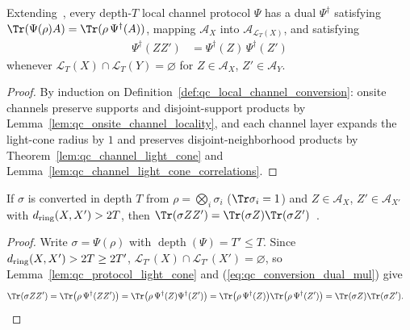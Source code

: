 \begin{lemma}
    \label{lem:qc_protocol_light_cone}
    \leanok
    Extending~\cite[Theorem~1]{Malz2024Preparation}, every depth-$T$ local channel protocol $\Psi$ has a dual $\Psi^\dagger$ satisfying $\Tr(\Psi(\rho)A)=\Tr(\rho\,\Psi^\dagger(A))$, mapping $\mathcal A_X$ into $\mathcal A_{\mathcal L_T(X)}$, and satisfying
    \begin{align}
        \Psi^\dagger(ZZ') & =\Psi^\dagger(Z)\,\Psi^\dagger(Z')
        \label{eq:qc_conversion_dual_mul}
    \end{align}
    whenever $\mathcal L_T(X)\cap\mathcal L_T(Y)=\varnothing$ for $Z\in\mathcal A_X$, $Z'\in\mathcal A_Y$.
\end{lemma}
\begin{proof}
    \leanok
    By induction on Definition~\ref{def:qc_local_channel_conversion}: onsite channels preserve supports and disjoint-support products by Lemma~\ref{lem:qc_onsite_channel_locality}, and each channel layer expands the light-cone radius by $1$ and preserves disjoint-neighborhood products by Theorem~\ref{lem:qc_channel_light_cone} and Lemma~\ref{lem:qc_channel_light_cone_correlations}.
\end{proof}

\begin{lemma}
    \label{lem:qc_local_channel_conversion_correlations}
    \leanok
    If $\sigma$ is converted in depth $T$ from $\rho=\bigotimes_i\sigma_i$ ($\Tr\sigma_i=1$) and $Z\in\mathcal A_X$, $Z'\in\mathcal A_{X'}$ with $d_{\rm ring}(X,X')>2T$, then $\Tr(\sigma ZZ')=\Tr(\sigma Z)\Tr(\sigma Z')$~\cite{Piroli2021LOCC}.
\end{lemma}
\begin{proof}
    \leanok
    Write $\sigma=\Psi(\rho)$ with $\operatorname{depth}(\Psi)=T'\le T$. Since $d_{\rm ring}(X,X')>2T\ge2T'$, $\mathcal L_{T'}(X)\cap\mathcal L_{T'}(X')=\varnothing$, so Lemma~\ref{lem:qc_protocol_light_cone} and (\ref{eq:qc_conversion_dual_mul}) give
    \begin{align}
        \Tr(\sigma ZZ') & =\Tr\bigl(\rho\,\Psi^\dagger(ZZ')\bigr)
        =\Tr\bigl(\rho\,\Psi^\dagger(Z)\Psi^\dagger(Z')\bigr)
        =\Tr\bigl(\rho\,\Psi^\dagger(Z)\bigr)\Tr\bigl(\rho\,\Psi^\dagger(Z')\bigr)
        =\Tr(\sigma Z)\Tr(\sigma Z').\notag
    \end{align}
\end{proof}

